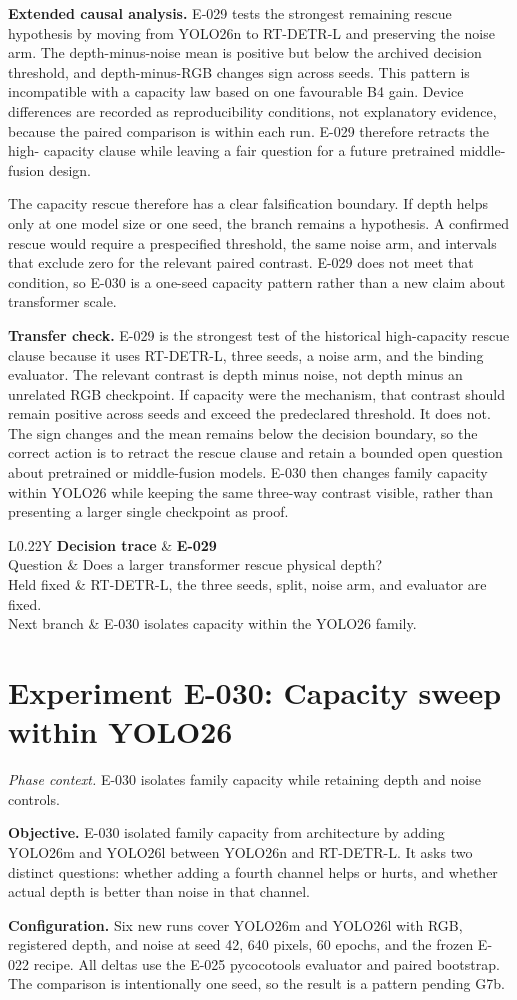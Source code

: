 \documentclass[preprint,12pt]{elsarticle}
\newcommand{\experiment}[2]{\par\medskip\Needspace{7\baselineskip}\section{Experiment #1: #2}}
\newcommand{\decisioncard}[4]{%
\begin{table}[H]\centering\small
\begin{tabularx}{\columnwidth}{L{0.22\columnwidth}Y}
\toprule
\textbf{Decision trace} & \textbf{#1}\\
Question & #2\\
Held fixed & #3\\
Next branch & #4\\
\bottomrule
\end{tabularx}
\end{table}}
\newcommand{\phasecontext}[1]{%
\par\smallskip\noindent\textit{Phase context.} #1\par\smallskip}
\begin{document}
\textbf{Extended causal analysis.} E-029 tests the strongest remaining rescue
hypothesis by moving from YOLO26n to RT-DETR-L and preserving the noise arm.
The depth-minus-noise mean is positive but below the archived decision threshold,
and depth-minus-RGB changes sign across seeds. This pattern is incompatible
with a capacity law based on one favourable B4 gain. Device differences are
recorded as reproducibility conditions, not explanatory evidence, because the
paired comparison is within each run. E-029 therefore retracts the high-
capacity clause while leaving a fair question for a future pretrained
middle-fusion design.

The capacity rescue therefore has a clear falsification boundary. If depth
helps only at one model size or one seed, the branch remains a hypothesis. A
confirmed rescue would require a prespecified threshold, the same noise arm,
and intervals that exclude zero for the relevant paired contrast. E-029 does
not meet that condition, so E-030 is a one-seed capacity pattern rather than a
new claim about transformer scale.

\textbf{Transfer check.} E-029 is the strongest test of the historical
high-capacity rescue clause because it uses RT-DETR-L, three seeds, a noise
arm, and the binding evaluator. The relevant contrast is depth minus noise,
not depth minus an unrelated RGB checkpoint. If capacity were the mechanism,
that contrast should remain positive across seeds and exceed the predeclared
threshold. It does not. The sign changes and the mean remains below the
decision boundary, so the correct action is to retract the rescue clause and
retain a bounded open question about pretrained or middle-fusion models. E-030
then changes family capacity within YOLO26 while keeping the same three-way
contrast visible, rather than presenting a larger single checkpoint as proof.

\decisioncard{E-029}{Does a larger transformer rescue physical depth?}{RT-DETR-L, the three seeds, split, noise arm, and evaluator are fixed.}{E-030 isolates capacity within the YOLO26 family.}
\experiment{E-030}{Capacity sweep within YOLO26}
\phasecontext{E-030 isolates family capacity while retaining depth and noise controls.}
\textbf{Objective.} E-030 isolated family capacity from architecture by
adding YOLO26m and YOLO26l between YOLO26n and RT-DETR-L. It asks two distinct
questions: whether adding a fourth channel helps or hurts, and whether actual
depth is better than noise in that channel.

\textbf{Configuration.} Six new runs cover YOLO26m and YOLO26l with RGB,
registered depth, and noise at seed 42, 640 pixels, 60 epochs, and the frozen
E-022 recipe. All deltas use the E-025 pycocotools evaluator and paired
bootstrap. The comparison is intentionally one seed, so the result is a
pattern pending G7b.
\end{document}
